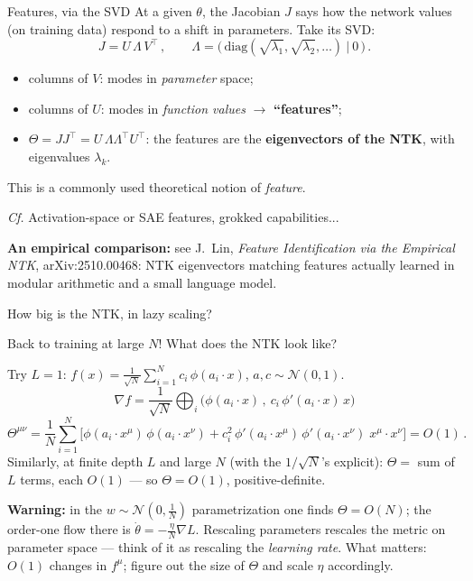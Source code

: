 \documentclass[11pt]{beamer}
\newcommand{\hl}[1]{{\color{blue!60!black}\textbf{#1}}}
\begin{document}
\begin{frame}{Features, via the SVD}
  At a given $\theta$, the Jacobian $J$ says how the network values (on
  training data) respond to a shift in parameters. Take its SVD:
  \[
    J = U\,\Lambda\, V^{\!\top}\,,\qquad
    \Lambda = \big(\,\mathrm{diag}(\sqrt{\lambda_1}, \sqrt{\lambda_2},
    \dots)\ \big|\ 0\,\big)\,.
  \]
  \begin{itemize}
    \item columns of $V$: modes in \emph{parameter} space;
    \item columns of $U$: modes in \emph{function values} $\to$
      \hl{``features''};
    \item $\Theta = JJ^{\!\top} = U\,\Lambda\Lambda^{\!\top} U^{\!\top}$:
      the features are the \hl{eigenvectors of the NTK}, with
      eigenvalues $\lambda_k$.
  \end{itemize}
  \vspace{2mm}

  This is a commonly used theoretical notion of \emph{feature}.
  
  \medskip
  \emph{Cf.} Activation-space or SAE features, grokked capabilities...
  \vspace{2mm}

  {\footnotesize \hl{An empirical comparison:} see J.~Lin,
  \emph{Feature Identification via the Empirical NTK},
  arXiv:2510.00468: NTK eigenvectors matching features actually learned in modular arithmetic and a small language model.}
\end{frame}

\begin{frame}{How big is the NTK, in lazy scaling?}

Back to training at large $N$! What does the NTK look like?

\medskip

  Try $L = 1$:\quad
  $\displaystyle f(x) = \frac{1}{\sqrt N}\sum_{i=1}^N c_i\,\phi(a_i\cdot x)$,
  \quad $a, c \sim \mathcal N(0,1)$.
  \[
    \nabla f = \frac{1}{\sqrt N}\bigoplus_i \Big(\phi(a_i\cdot x)\,,\
    c_i\,\phi'(a_i\cdot x)\, x\Big)
  \]
  \vspace{-.3cm}
  {\small
  \[
    \Theta^{\mu\nu} = \frac1N \sum_{i=1}^N
    \Big[\phi(a_i\cdot x^\mu)\,\phi(a_i\cdot x^\nu)
    + c_i^2\,\phi'(a_i\cdot x^\mu)\,\phi'(a_i\cdot x^\nu)\;
    x^\mu\!\cdot x^\nu\Big] = O(1)\,.
  \]}
  Similarly, at finite depth $L$ and large $N$ (with the $1/\sqrt N$'s
  explicit): $\Theta = $ sum of $L$ terms, each $O(1)$ --- so
  $\Theta = O(1)$, positive-definite.
  \vspace{2mm}

  {\footnotesize \hl{Warning:} in the $w \sim \mathcal N(0, \frac1N)$ parametrization one
  finds $\Theta = O(N)$; the order-one flow there is
  $\dot\theta = -\frac{\eta}{N}\nabla L$. Rescaling parameters rescales
  the metric on parameter space --- think of it as rescaling the
  \emph{learning rate}. What matters: $O(1)$ changes in $f^\mu$; figure
  out the size of $\Theta$ and scale $\eta$ accordingly.}
\end{frame}
\end{document}
